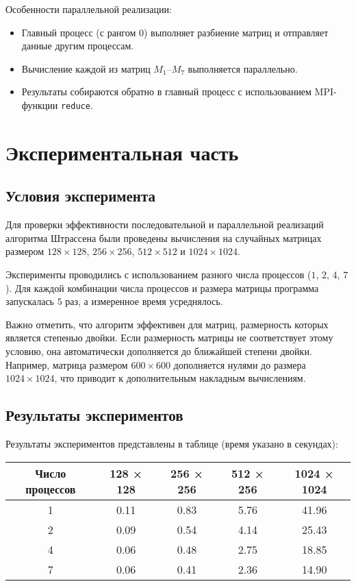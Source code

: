 \documentclass[a4paper, 14pt]{extarticle}
\begin{document}
Особенности параллельной реализации:
\begin{itemize}
    \item Главный процесс (с рангом 0) выполняет разбиение матриц и отправляет данные другим процессам.
    \item Вычисление каждой из матриц \(M_1\)–\(M_7\) выполняется параллельно.
    \item Результаты собираются обратно в главный процесс с использованием MPI-функции \texttt{reduce}.
\end{itemize}


    \newpage
    \section{Экспериментальная часть}
\subsection{Условия эксперимента}
Для проверки эффективности последовательной и параллельной реализаций алгоритма Штрассена были проведены вычисления на случайных матрицах размером \(128 \times 128\), \(256 \times 256\), \(512 \times 512\) и \(1024 \times 1024\).  

Эксперименты проводились с использованием разного числа процессов (\(1\), \(2\), \(4\), \(7\)). Для каждой комбинации числа процессов и размера матрицы программа запускалась \(5\) раз, а измеренное время усреднялось.  

Важно отметить, что алгоритм эффективен для матриц, размерность которых является степенью двойки. Если размерность матрицы не соответствует этому условию, она автоматически дополняется до ближайшей степени двойки. Например, матрица размером \(600 \times 600\) дополняется нулями до размера \(1024 \times 1024\), что приводит к дополнительным накладным вычислениям.


\subsection{Результаты экспериментов}
Результаты экспериментов представлены в таблице (время указано в секундах):

\begin{table}[H]
\begin{tabular}{|c|c|c|c|c|}
\hline
Число процессов & 128 × 128 & 256 × 256 & 512 × 256 & 1024 × 1024 \\ \hline
1               & 0.11      & 0.83      & 5.76      & 41.96       \\ \hline
2               & 0.09      & 0.54      & 4.14      & 25.43       \\ \hline
4               & 0.06      & 0.48      & 2.75      & 18.85       \\ \hline
7               & 0.06      & 0.41      & 2.36      & 14.90       \\ \hline
\end{tabular}
\end{table}
\end{document}
